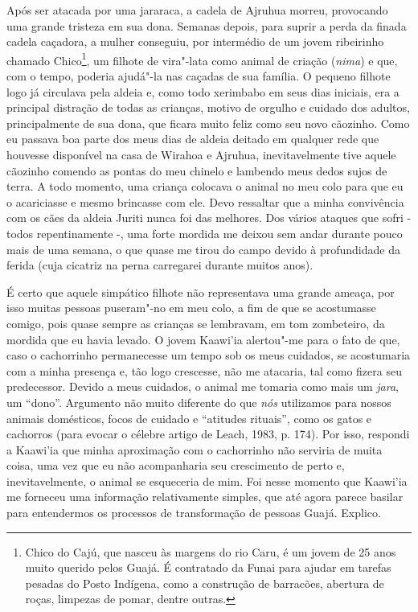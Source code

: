 Após ser atacada por uma jararaca, a cadela de Ajruhua morreu,
provocando uma grande tristeza em sua dona. Semanas depois, para suprir
a perda da finada cadela caçadora, a mulher conseguiu, por intermédio de
um jovem ribeirinho chamado Chico\footnote{Chico do Cajú, que nasceu às
  margens do rio Caru, é um jovem de 25 anos muito querido pelos Guajá.
  É contratado da Funai para ajudar em tarefas pesadas do Posto
  Indígena, como a construção de barracões, abertura de roças, limpezas
  de pomar, dentre outras.}, um filhote de vira"-lata como animal de
criação (\emph{nima}) e que, com o tempo, poderia ajudá"-la nas caçadas
de sua família. O pequeno filhote logo já circulava pela aldeia e, como
todo xerimbabo em seus dias iniciais, era a principal distração de todas
as crianças, motivo de orgulho e cuidado dos adultos, principalmente de
sua dona, que ficara muito feliz como seu novo cãozinho. Como eu passava
boa parte dos meus dias de aldeia deitado em qualquer rede que houvesse
disponível na casa de Wirahoa e Ajruhua, inevitavelmente tive aquele
cãozinho comendo as pontas do meu chinelo e lambendo meus dedos sujos de
terra. A todo momento, uma criança colocava o animal no meu colo para
que eu o acariciasse e mesmo brincasse com ele. Devo ressaltar que a
minha convivência com os cães da aldeia Juriti nunca foi das melhores.
Dos vários ataques que sofri - todos repentinamente -, uma forte mordida
me deixou sem andar durante pouco mais de uma semana, o que quase me
tirou do campo devido à profundidade da ferida (cuja cicatriz na perna
carregarei durante muitos anos).

É certo que aquele simpático filhote não representava uma grande ameaça,
por isso muitas pessoas puseram"-no em meu colo, a fim de que se
acostumasse comigo, pois quase sempre as crianças se lembravam, em tom
zombeteiro, da mordida que eu havia levado. O jovem Kaawi'ia alertou"-me
para o fato de que, caso o cachorrinho permanecesse um tempo sob os meus
cuidados, se acostumaria com a minha presença e, tão logo crescesse, não
me atacaria, tal como fizera seu predecessor. Devido a meus cuidados, o
animal me tomaria como mais um \emph{jara}, um ``dono''. Argumento não
muito diferente do que \emph{nós} utilizamos para nossos animais
domésticos, focos de cuidado e ``atitudes rituais'', como os gatos e
cachorros (para evocar o célebre artigo de Leach, 1983, p. 174). Por
isso, respondi a Kaawi'ia que minha aproximação com o cachorrinho não
serviria de muita coisa, uma vez que eu não acompanharia seu crescimento
de perto e, inevitavelmente, o animal se esqueceria de mim. Foi nesse
momento que Kaawi'ia me forneceu uma informação relativamente simples,
que até agora parece basilar para entendermos os processos de
transformação de pessoas Guajá. Explico.

